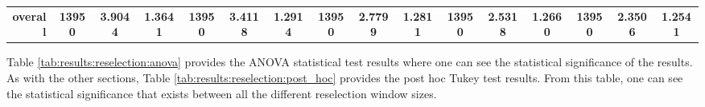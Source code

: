 \begin{table}[htbp]
{\begin{tabular}{rccccccccccccccc}
    \midrule
    \textbf{overall} & \textbf{13950} & \textbf{3.9044} & \textbf{1.3641} & \textbf{13950} & \textbf{3.4118} & \textbf{1.2914} & \textbf{13950} & \textbf{2.7799} & \textbf{1.2811} & \textbf{13950} & \textbf{2.5318} & \textbf{1.2660} & \textbf{13950} & \cellcolor[rgb]{ .776,  .937,  .808}\textcolor[rgb]{ 0,  .38,  0}{\textbf{2.3506}} & \textbf{1.2541} \\
    \end{tabular}%
    }
\end{table}%

Table \ref{tab:results:reselection:anova} provides the ANOVA statistical test results where one can see the statistical significance of the results. As with the other sections, Table \ref{tab:results:reselection:post_hoc} provides the post hoc Tukey test results. From this table, one can see the statistical significance that exists between all the different reselection window sizes.

\begin{table}[htbp]
	\centering
	\caption{ANOVA - Rank - BHH Variant: Reselection}
	\label{tab:results:reselection:anova}%
	\par\bigskip
\end{table}

